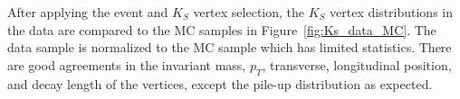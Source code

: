 After applying the event and $K_{S}$ vertex selection, the $K_{S}$ vertex distributions in the data are compared to the MC samples in Figure~\ref{fig:Ks_data_MC}. The data sample is normalized to the MC sample which has limited statistics. There are good agreements in the invariant mass, $p_{T}$, transverse, longitudinal position, and decay length of the vertices, except the pile-up distribution as expected.


\begin{figure}[!htb]
    \centering
     \\
      \\

\end{figure}
